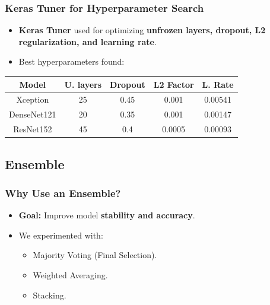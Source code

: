 \begin{frame}
    \frametitle{Keras Tuner for Hyperparameter Search}
    \begin{itemize}
        \item \textbf{Keras Tuner} used for optimizing \textbf{unfrozen layers, dropout, L2 regularization, and learning rate}.
        \item Best hyperparameters found:
    \end{itemize}
    \begin{table}[]
        \centering
        \begin{tabular}{|c|c|c|c|c|}
            \hline
            \textbf{Model} & \textbf{U. layers} & \textbf{Dropout} & \textbf{L2 Factor} & \textbf{L. Rate} \\
            \hline
            Xception & 25 & 0.45 & 0.001 & 0.00541 \\
            DenseNet121 & 20 & 0.35 & 0.001 & 0.00147 \\
            ResNet152 & 45 & 0.4 & 0.0005 & 0.00093 \\
            \hline
        \end{tabular}
    \end{table}
\end{frame}

\subsection{Ensemble}
\label{subsec:ensemble}

\begin{frame}
    \frametitle{Why Use an Ensemble?}
    \begin{itemize}
        \item \textbf{Goal:} Improve model \textbf{stability and accuracy}.
        \item We experimented with:
            \begin{itemize}
                \item Majority Voting (Final Selection).
                \item Weighted Averaging.
                \item Stacking.
            \end{itemize}
    \end{itemize}
\end{frame}



